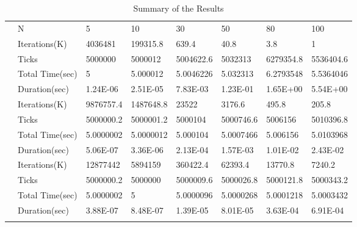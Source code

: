 \documentclass[a4paper,oneside]{book}
\begin{document}
\begin{table}[!ht]
    \centering
    \caption{Summary of the Results}\label{tab:summary}
    \begin{tabular}{||l|l||l|l|l|l|l|l||}
        \hhline{|t:==:t:======:t|}
                                              & N               & 5         & 10        & 30        & 50        & 80        & 100       \\
        \hhline{||==::======||}
        \multirow{4}{1.5cm}{$O(N^6)$ Version} & Iterations(K)   & 4036481   & 199315.8  & 639.4     & 40.8      & 3.8       & 1         \\
        \hhline{|~-||------|}                 & Ticks           & 5000000   & 5000012   & 5004622.6 & 5032313   & 6279354.8 & 5536404.6 \\
        \hhline{|~-||------|}                 & Total Time(sec) & 5         & 5.000012  & 5.0046226 & 5.032313  & 6.2793548 & 5.5364046 \\
        \hhline{|~-||------|}                 & Duration(sec)   & 1.24E-06  & 2.51E-05  & 7.83E-03  & 1.23E-01  & 1.65E+00  & 5.54E+00  \\
        \hhline{||==::======||}
        \multirow{4}{1.5cm}{$O(N^4)$ Version} & Iterations(K)   & 9876757.4 & 1487648.8 & 23522     & 3176.6    & 495.8     & 205.8     \\
        \hhline{|~-||------|}                 & Ticks           & 5000000.2 & 5000001.2 & 5000104   & 5000746.6 & 5006156   & 5010396.8 \\
        \hhline{|~-||------|}                 & Total Time(sec) & 5.0000002 & 5.0000012 & 5.000104  & 5.0007466 & 5.006156  & 5.0103968 \\
        \hhline{|~-||------|}                 & Duration(sec)   & 5.06E-07  & 3.36E-06  & 2.13E-04  & 1.57E-03  & 1.01E-02  & 2.43E-02  \\
        \hhline{||==::======||}
        \multirow{4}{1.5cm}{O($N^3)$ Version} & Iterations(K)   & 12877442  & 5894159   & 360422.4  & 62393.4   & 13770.8   & 7240.2    \\
        \hhline{|~-||------|}                 & Ticks           & 5000000.2 & 5000000   & 5000009.6 & 5000026.8 & 5000121.8 & 5000343.2 \\
        \hhline{|~-||------|}                 & Total Time(sec) & 5.0000002 & 5         & 5.0000096 & 5.0000268 & 5.0001218 & 5.0003432 \\
        \hhline{|~-||------|}                 & Duration(sec)   & 3.88E-07  & 8.48E-07  & 1.39E-05  & 8.01E-05  & 3.63E-04  & 6.91E-04  \\
        \hhline{|b:==:b:======:b|}
    \end{tabular}
\end{table}
\end{document}
